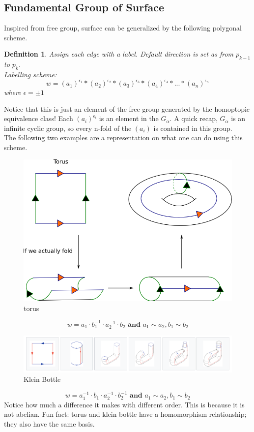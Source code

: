 \documentclass[12pt,letterpaper]{article}
\newtheorem{mydef}{Definition}
\begin{document}
\begin{normalsize}
\subsection{Fundamental Group of Surface}
Inspired from free group, surface can be generalized by the following polygonal scheme. 
\begin{mydef}\label{def:def444} 
Assign each edge with a label. Default direction is set as from $p_{k-1}$ to $p_{k}$.\\
Labelling scheme:
$$w = (a_1)^{\epsilon_1} \ast       (a_2)^{\epsilon_2} \ast    (a_3)^{\epsilon_3} \ast (a_4)^{\epsilon_4} \ast...        \ast(a_n)^{\epsilon_n} $$
where $\epsilon = \pm 1$  
\end{mydef}
Notice that this is just an element of the free group generated by the homoptopic equivalence class! Each $(a_i)^{\epsilon_i}$ is an element in the $G_\alpha$. A quick recap, $G_\alpha$ is an infinite cyclic group, so every n-fold of the $(a_i)$ is contained in this group. \\
The following two examples are a representation on what one can do using this scheme. 
\vspace{10mm}
 \begin{figure}[hbt!]
     \centering
     \includegraphics[scale=0.8]{2}
     \caption{torus}
     \label{fig:my_label}
 \end{figure}
$$w = a_1 \cdot b_{1}^{-1} \cdot a_{2}^{-1} \cdot b_2 \textbf{ and } a_1 \sim a_2, b_1 \sim b_2$$
 \begin{figure}[hbt!]
     \centering
     \includegraphics[scale=0.5]{3}
     \caption{Klein Bottle}
     \label{fig:my_label}
 \end{figure}
$$w = a_{1}^{-1} \cdot b_{1} \cdot a_{2}^{-1} \cdot b_2^{-1} \textbf{ and } a_1 \sim a_2, b_1 \sim b_2$$
Notice how much a difference it makes with different order. This is because it is not abelian. Fun fact: torus and klein bottle have a homomorphism relationship; they also have the same basis. 

\end{normalsize}
\end{document}
